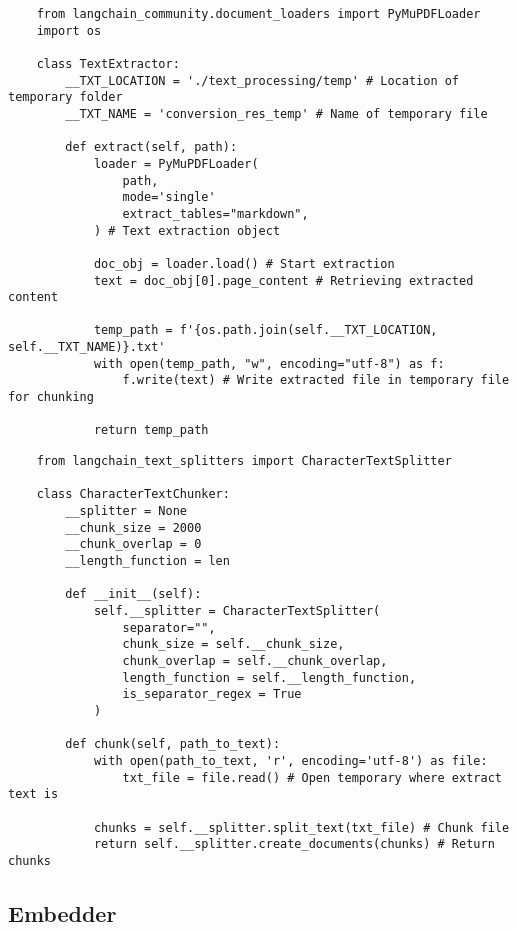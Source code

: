 \begin{verbatim}
    from langchain_community.document_loaders import PyMuPDFLoader
    import os
    
    class TextExtractor:
        __TXT_LOCATION = './text_processing/temp' # Location of temporary folder 
        __TXT_NAME = 'conversion_res_temp' # Name of temporary file
    
        def extract(self, path):
            loader = PyMuPDFLoader(
                path,
                mode='single'
                extract_tables="markdown",
            ) # Text extraction object  
    
            doc_obj = loader.load() # Start extraction
            text = doc_obj[0].page_content # Retrieving extracted content
    
            temp_path = f'{os.path.join(self.__TXT_LOCATION, self.__TXT_NAME)}.txt'
            with open(temp_path, "w", encoding="utf-8") as f:
                f.write(text) # Write extracted file in temporary file for chunking
    
            return temp_path
\end{verbatim}

\begin{verbatim}
    from langchain_text_splitters import CharacterTextSplitter
    
    class CharacterTextChunker:
        __splitter = None 
        __chunk_size = 2000
        __chunk_overlap = 0
        __length_function = len
    
        def __init__(self):
            self.__splitter = CharacterTextSplitter(
                separator="",
                chunk_size = self.__chunk_size,
                chunk_overlap = self.__chunk_overlap,
                length_function = self.__length_function,
                is_separator_regex = True
            )
    
        def chunk(self, path_to_text):
            with open(path_to_text, 'r', encoding='utf-8') as file:
                txt_file = file.read() # Open temporary where extract text is
    
            chunks = self.__splitter.split_text(txt_file) # Chunk file
            return self.__splitter.create_documents(chunks) # Return chunks
\end{verbatim}

\subsection{Embedder}%
\label{subsec:Embedder}

